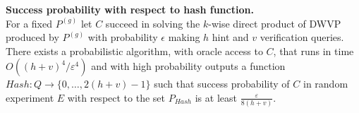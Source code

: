%
%
\begin{lemma} \textbf{Success probability with respect to hash function.} \\
For a fixed $P^{(g)}$ let $C$ succeed in solving the $k$-wise direct product of DWVP produced by $P^{(g)}$
with probability $\epsilon$ making $h$ hint and $v$ verification queries.
There exists a probabilistic algorithm, with oracle access to $C$, that runs in time $O((h+v)^4/\varepsilon^4)$
and with high probability outputs a function $Hash: Q \rightarrow \{0, \dots, 2(h+v)-1\}$ such that success probability of
$C$ in random experiment $E$ with respect to the set $P_{Hash}$ is at least $\frac{\varepsilon}{8(h+v)}$.
\end{lemma}
%
%
